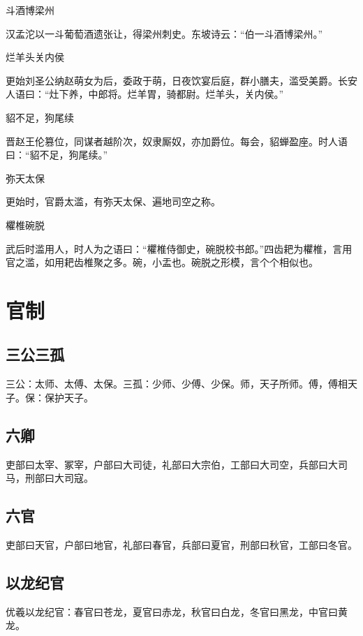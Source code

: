 \documentclass[a4paper,12pt,UTF8,twoside]{ctexbook}
\begin{document}
    斗酒博梁州
    
    汉孟沱以一斗葡萄酒遗张让，得梁州刺史。东坡诗云：“伯一斗酒博梁州。”
    
    烂羊头关内侯
    
    更始刘圣公纳赵萌女为后，委政于萌，日夜饮宴后庭，群小膳夫，滥受美爵。长安人语曰：“灶下养，中郎将。烂羊胃，骑都尉。烂羊头，关内侯。”
    
    貂不足，狗尾续
    
    晋赵王伦篡位，同谋者越阶次，奴隶厮奴，亦加爵位。每会，貂蝉盈座。时人语曰：“貂不足，狗尾续。”
    
    弥天太保
    
    更始时，官爵太滥，有弥天太保、遍地司空之称。
    
    欋椎碗脱
    
    武后时滥用人，时人为之语曰：“欋椎侍御史，碗脱校书郎。”四齿耙为欋椎，言用官之滥，如用耙齿椎聚之多。碗，小盂也。碗脱之形模，言个个相似也。
    
    \chapter{官制}
    
    \section{三公三孤}
    
    三公：太师、太傅、太保。三孤：少师、少傅、少保。师，天子所师。傅，傅相天子。保：保护天子。
    
    \section{六卿}
    
    吏部曰太宰、冢宰，户部曰大司徒，礼部曰大宗伯，工部曰大司空，兵部曰大司马，刑部曰大司寇。
    
    \section{六官}
    
    吏部曰天官，户部曰地官，礼部曰春官，兵部曰夏官，刑部曰秋官，工部曰冬官。
    
    \section{以龙纪官}
    
    优羲以龙纪官：春官曰苍龙，夏官曰赤龙，秋官曰白龙，冬官曰黑龙，中官曰黄龙。
    
\end{document}
